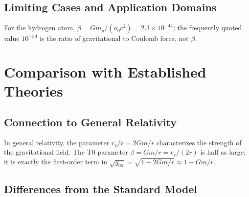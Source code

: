 	\subsection{Limiting Cases and Application Domains}
	\label{subsec:limiting_cases}
	
	\begin{table}[htbp]
		\centering
		\caption{Typical $\beta$-values for various physical systems}
		\label{tab:beta_values}
	\end{table}
	For the hydrogen atom, $\beta = G m_p/(a_0 c^2) = 2.3 \times 10^{-44}$; the frequently quoted value $10^{-39}$ is the ratio of gravitational to Coulomb force, not $\beta$.
	
	\section{Comparison with Established Theories}
	\label{sec:theory_comparison}
	
	\subsection{Connection to General Relativity}
	\label{subsec:gr_connection}
	
	In general relativity, the parameter $r_s/r = 2Gm/r$ characterizes the strength of the gravitational field. The T0 parameter $\beta = Gm/r = r_s/(2r)$ is half as large; it is exactly the first-order term in $\sqrt{g_{00}} = \sqrt{1 - 2Gm/r} \approx 1 - Gm/r$.
	
	\subsection{Differences from the Standard Model}
	\label{subsec:sm_differences}
	
